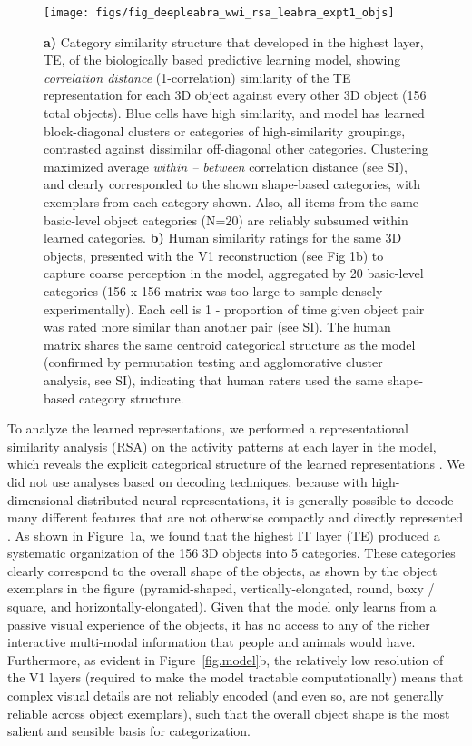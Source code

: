 \documentclass[11pt,twoside]{article}
\newif\myifpdf
\begin{document}
\begin{figure}
  \centering\texttt{[image: figs/fig\_deepleabra\_wwi\_rsa\_leabra\_expt1\_objs]}
  \caption{{\bf a)} Category similarity structure that developed in the highest layer, TE, of the biologically based predictive learning model, showing \emph{correlation distance} (1-correlation) similarity of the TE representation for each 3D object against every other 3D object (156 total objects).  Blue cells have high similarity, and model has learned block-diagonal clusters or categories of high-similarity groupings, contrasted against dissimilar off-diagonal other categories.  Clustering maximized average \emph{within -- between} correlation distance (see SI), and clearly corresponded to the shown shape-based categories, with exemplars from each category shown.  Also, all items from the same basic-level object categories (N=20) are reliably subsumed within learned categories. {\bf b)} Human similarity ratings for the same 3D objects, presented with the V1 reconstruction (see Fig 1b) to capture coarse perception in the model, aggregated by 20 basic-level categories (156 x 156 matrix was too large to sample densely experimentally).  Each cell is 1 - proportion of time given object pair was rated more similar than another pair (see SI).  The human matrix shares the same centroid categorical structure as the model (confirmed by permutation testing and agglomorative cluster analysis, see SI), indicating that human raters used the same shape-based category structure.}
  \label{fig.rsa}
\end{figure}

To analyze the learned representations, we performed a representational similarity analysis (RSA) on the activity patterns at each layer in the model, which reveals the explicit categorical structure of the learned representations \citep{KriegeskorteMurBandettini08,CadieuHongYaminsEtAl14}. We did not use analyses based on decoding techniques, because with high-dimensional distributed neural representations, it is generally possible to decode many different features that are not otherwise compactly and directly represented \citep{FusiMillerRigotti16}.  As shown in Figure~\ref{fig.rsa}a, we found that the highest IT layer (TE) produced a systematic organization of the 156 3D objects into 5 categories.  These categories clearly correspond to the overall shape of the objects, as shown by the object exemplars in the figure (pyramid-shaped, vertically-elongated, round, boxy / square, and horizontally-elongated).  Given that the model only learns from a passive visual experience of the objects, it has no access to any of the richer interactive multi-modal information that people and animals would have.  Furthermore, as evident in Figure~\ref{fig.model}b, the relatively low resolution of the V1 layers (required to make the model tractable computationally) means that complex visual details are not reliably encoded (and even so, are not generally reliable across object exemplars), such that the overall object shape is the most salient and sensible basis for categorization.
\end{document}
